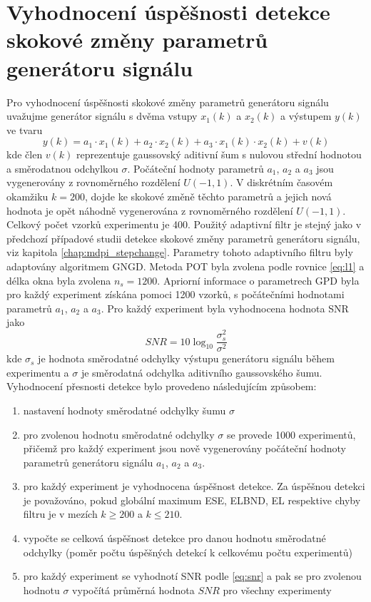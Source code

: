 \section{Vyhodnocení úspěšnosti detekce skokové změny parametrů generátoru signálu}\label{chap:mdpi_step_stats}
Pro vyhodnocení úspěšnosti skokové změny parametrů generátoru signálu uvažujme generátor signálu s dvěma vstupy $x_1(k)$ a $x_2(k)$ a výstupem $y(k)$ ve tvaru
\begin{equation}
y(k)=a_1\cdot x_1(k)+a_2\cdot x_2(k)+a_3\cdot x_1(k) \cdot x_2(k)+v(k)
\end{equation}
kde člen $v(k)$ reprezentuje gaussovský aditivní šum s nulovou střední hodnotou a směrodatnou odchylkou $\sigma$. Počáteční hodnoty parametrů $a_1$, $a_2$ a $a_3$ jsou vygenerovány z rovnoměrného rozdělení $U(-1,1)$. V diskrétním časovém okamžiku $k=200$, dojde ke skokové změně těchto parametrů a jejich nová hodnota je opět náhodně vygenerována z rovnoměrného rozdělení $U(-1,1)$. Celkový počet vzorků experimentu je 400.
Použitý adaptivní filtr je stejný jako v předchozí případové studii detekce skokové změny parametrů generátoru signálu, viz kapitola \ref{chap:mdpi_stepchange}. Parametry tohoto adaptivního filtru byly adaptovány algoritmem GNGD. Metoda POT byla zvolena podle rovnice \ref{eq:l1} a délka okna byla zvolena $n_s=1200$. Apriorní informace o parametrech GPD byla pro každý experiment získána pomoci 1200 vzorků, s počátečními hodnotami parametrů $a_1$, $a_2$ a $a_3$. Pro každý experiment byla vyhodnocena hodnota SNR jako
\begin{equation}\label{eq:snr}
SNR=10\log_{10}\frac{\sigma_s^2}{\sigma^2}
\end{equation}
kde $\sigma_s$  je hodnota směrodatné odchylky výstupu generátoru signálu během experimentu a $\sigma$ je směrodatná odchylka aditivního gaussovského šumu. Vyhodnocení přesnosti detekce bylo provedeno následujícím způsobem:
\begin{enumerate}
\item nastavení hodnoty směrodatné odchylky šumu $\sigma$
\item pro zvolenou hodnotu směrodatné odchylky $\sigma$ se provede 1000 experimentů, přičemž pro každý experiment jsou nově vygenerovány počáteční hodnoty parametrů generátoru signálu $a_1$, $a_2$ a $a_3$.
\item pro každý experiment je vyhodnocena úspěšnost detekce. Za úspěšnou detekci je považováno, pokud globální maximum ESE, ELBND, EL respektive chyby filtru je v mezích $k\geq 200$ a $k\leq 210$. 
\item vypočte se celková úspěšnost detekce pro danou hodnotu směrodatné odchylky (poměr počtu úspěšných detekcí k celkovému počtu experimentů)
\item pro každý experiment se vyhodnotí SNR podle \ref{eq:snr} a pak se pro zvolenou hodnotu $\sigma$ vypočítá průměrná hodnota $SNR$ pro všechny experimenty
\end{enumerate}
